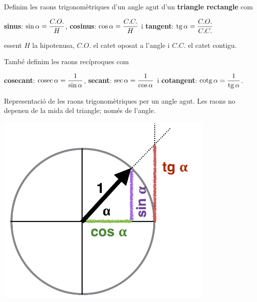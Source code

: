 \begin{theorybox}
	
	Definim les raons trigonomètriques d'un angle agut d'un \textbf{triangle rectangle} com
	
	\begin{center}
		\textbf{sinus}: $\sin \alpha = \dfrac{C.O.}{H}$, \textbf{cosinus}: $\cos \alpha = \dfrac{C.C.}{H}$ i \textbf{tangent}: $\mathrm{tg}\, \alpha = \dfrac{C.O.}{C.C.}$
	\end{center}
	
	essent $H$ la hipotenusa, $C.O.$ el catet oposat a l'angle i $C.C.$ el catet contigu. 
	
	També definim les raons recíproques com 
	
	\begin{center}
		\textbf{cosecant}:	$\mathrm{cosec}\, \alpha = \dfrac{1}{\sin \alpha}$, \textbf{secant}: $\sec \alpha = \dfrac{1}{\cos \alpha}$ i \textbf{cotangent}: $\mathrm{cotg}\, \alpha = \dfrac{1}{\mathrm{tg}\, \alpha}$.
	\end{center}
	
	
	\begin{minipage}{0.65\textwidth}
		\vspace{-0.75cm}	
		
		\vspace{0.4cm}
		Representació de les raons trigonomètriques per un angle agut. Les raons no depenen de 
		la mida del triangle; només de l'angle.
	\end{minipage}
	\begin{minipage}{0.35\textwidth}
		
		\begin{center}
			\includegraphics*[width=0.8\textwidth]{img-03/chap-trig-grafraons.png}
		\end{center}
	\end{minipage}
\end{theorybox}


